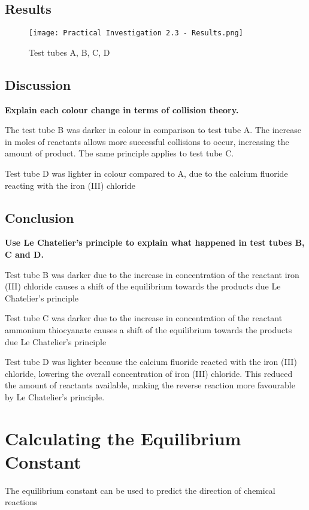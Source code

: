 	\subsection{Results}
		\begin{figure}[H]
			\centering
			\texttt{[image: Practical Investigation 2.3 - Results.png]}
			\caption{Test tubes A, B, C, D}
		\end{figure}

	\subsection{Discussion}
		\textbf{Explain each colour change in terms of collision theory.}

		The test tube B was darker in colour in comparison to test tube A. The increase in moles of reactants allows more successful collisions to occur, increasing the amount of product. The same principle applies to test tube C.

		Test tube D was lighter in colour compared to A, due to the calcium fluoride reacting with the iron (III) chloride 

	\subsection{Conclusion}
		\textbf{Use Le Chatelier's principle to explain what happened in test tubes B, C and D.}

		Test tube B was darker due to the increase in concentration of the reactant iron (III) chloride causes a shift of the equilibrium towards the products due Le Chatelier's principle
		
		Test tube C was darker due to the increase in concentration of the reactant ammonium thiocyanate causes a shift of the equilibrium towards the products due Le Chatelier's principle

		Test tube D was lighter because the calcium fluoride reacted with the iron (III) chloride, lowering the overall concentration of iron (III) chloride. This reduced the amount of reactants available, making the reverse reaction more favourable by Le Chatelier's principle.

\section{Calculating the Equilibrium Constant} \label{5/11/2024}
	The equilibrium constant can be used to predict the direction of chemical reactions

